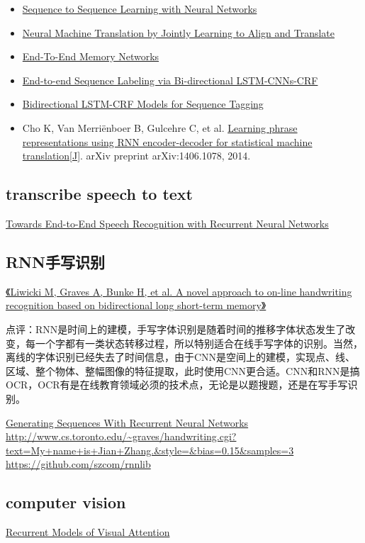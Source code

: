 \documentclass[UTF8,11pt,a4paper]{ctexart}
\begin{document}
\begin{itemize}
\item \href{https://arxiv.org/pdf/1409.3215.pdf}{Sequence to Sequence Learning with Neural Networks}
\item \href{https://arxiv.org/abs/1409.0473}{Neural Machine Translation by Jointly Learning to Align and Translate}
\item \href{https://arxiv.org/abs/1503.08895}{End-To-End Memory Networks}
\item \href{https://arxiv.org/pdf/1603.01354v5.pdf}{End-to-end Sequence Labeling via Bi-directional LSTM-CNNs-CRF}
\item \href{https://arxiv.org/pdf/1508.01991v1.pdf}{Bidirectional LSTM-CRF Models for Sequence Tagging}
\item Cho K, Van Merriënboer B, Gulcehre C, et al. \href{http://arxiv.org/pdf/1406.1078}{Learning phrase representations using RNN encoder-decoder for statistical machine translation[J]}. arXiv preprint arXiv:1406.1078, 2014.
\end{itemize}


\subsection{transcribe speech to text}
\href{http://proceedings.mlr.press/v32/graves14.pdf}{Towards End-to-End Speech Recognition with Recurrent Neural Networks}

\subsection{RNN手写识别}
\href{http://www6.in.tum.de/Main/Publications/Liwicki2007a.pdf}{《Liwicki M, Graves A, Bunke H, et al. A novel approach to on-line handwriting recognition based on bidirectional long short-term memory》}

点评：RNN是时间上的建模，手写字体识别是随着时间的推移字体状态发生了改变，每一个字都有一类状态转移过程，所以特别适合在线手写字体的识别。当然，离线的字体识别已经失去了时间信息，由于CNN是空间上的建模，实现点、线、区域、整个物体、整幅图像的特征提取，此时使用CNN更合适。CNN和RNN是搞OCR，OCR有是在线教育领域必须的技术点，无论是以题搜题，还是在写手写识别。

\href{https://arxiv.org/abs/1308.0850}{Generating Sequences With Recurrent Neural Networks}
\url{http://www.cs.toronto.edu/~graves/handwriting.cgi?text=My+name+is+Jian+Zhang.\&style=\&bias=0.15\&samples=3}
\url{https://github.com/szcom/rnnlib}

\subsection{computer vision}
\href{https://arxiv.org/abs/1406.6247}{Recurrent Models of Visual Attention}
\end{document}

